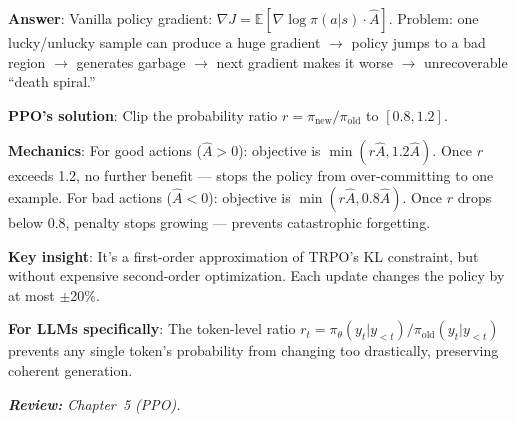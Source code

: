 \begin{questionbox}
\textbf{Answer}: Vanilla policy gradient: $\nabla J = \mathbb{E}[\nabla\log\pi(a|s) \cdot \hat{A}]$. Problem: one lucky/unlucky sample can produce a huge gradient $\rightarrow$ policy jumps to a bad region $\rightarrow$ generates garbage $\rightarrow$ next gradient makes it worse $\rightarrow$ unrecoverable ``death spiral.''

\textbf{PPO’s solution}: Clip the probability ratio $r = \pi_\text{new}/\pi_\text{old}$ to $[0.8, 1.2]$.

\textbf{Mechanics}: For good actions ($\hat{A}>0$): objective is $\min(r\hat{A}, 1.2\hat{A})$. Once $r$ exceeds 1.2, no further benefit --- stops the policy from over-committing to one example. For bad actions ($\hat{A}<0$): objective is $\min(r\hat{A}, 0.8\hat{A})$. Once $r$ drops below 0.8, penalty stops growing --- prevents catastrophic forgetting.

\textbf{Key insight}: It’s a first-order approximation of TRPO’s KL constraint, but without expensive second-order optimization. Each update changes the policy by at most $\pm$20\%.

\textbf{For LLMs specifically}: The token-level ratio $r_t = \pi_\theta(y_t|y_{<t})/\pi_\text{old}(y_t|y_{<t})$ prevents any single token’s probability from changing too drastically, preserving coherent generation.

\emph{\textbf{Review:} Chapter~5 (PPO).}
\end{questionbox}

